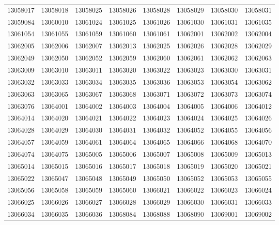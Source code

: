 \documentclass[abstract = on,listof=totoc, bibliography=totoc]{scrreprt}
\begin{document}
{\begin{longtable}{cccccccc}
13058017  &  13058018  &  13058025  &  13058026  &  13058028  &  13058029  &  13058030  &  13058031  \\ 
13059084  &  13060010  &  13061024  &  13061025  &  13061026  &  13061030  &  13061031  &  13061035  \\ 
13061054  &  13061055  &  13061059  &  13061060  &  13061061  &  13062001  &  13062002  &  13062004  \\ 
13062005  &  13062006  &  13062007  &  13062013  &  13062025  &  13062026  &  13062028  &  13062029  \\ 
13062049  &  13062050  &  13062052  &  13062059  &  13062060  &  13062061  &  13062062  &  13062063  \\ 
13063009  &  13063010  &  13063011  &  13063020  &  13063022  &  13063023  &  13063030  &  13063031  \\ 
13063032  &  13063033  &  13063034  &  13063035  &  13063036  &  13063053  &  13063054  &  13063062  \\ 
13063063  &  13063065  &  13063067  &  13063068  &  13063071  &  13063072  &  13063073  &  13063074  \\ 
13063076  &  13064001  &  13064002  &  13064003  &  13064004  &  13064005  &  13064006  &  13064012  \\ 
13064014  &  13064020  &  13064021  &  13064022  &  13064023  &  13064024  &  13064025  &  13064026  \\ 
13064028  &  13064029  &  13064030  &  13064031  &  13064032  &  13064052  &  13064055  &  13064056  \\ 
13064057  &  13064059  &  13064061  &  13064064  &  13064065  &  13064066  &  13064068  &  13064070  \\ 
13064074  &  13064075  &  13065005  &  13065006  &  13065007  &  13065008  &  13065009  &  13065013  \\ 
13065014  &  13065015  &  13065016  &  13065017  &  13065018  &  13065019  &  13065020  &  13065021  \\ 
13065022  &  13065047  &  13065048  &  13065049  &  13065050  &  13065052  &  13065053  &  13065055  \\ 
13065056  &  13065058  &  13065059  &  13065060  &  13066021  &  13066022  &  13066023  &  13066024  \\ 
13066025  &  13066026  &  13066027  &  13066028  &  13066029  &  13066030  &  13066031  &  13066033  \\ 
13066034  &  13066035  &  13066036  &  13068084  &  13068088  &  13068090  &  13069001  &  13069002  \\ 

\end{longtable}}
\end{document}
